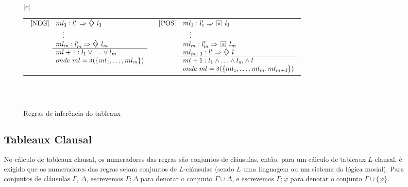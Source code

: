 \begin{figure*}[!tbh]
    \centering
    {\footnotesize
        \begin{tabular}{|c|}
            \hline
            \\
            \begin{tabular}{cc}
                $
                \begin{array}{cll}
                    \mbox{[NEG]} &ml_1: l_1 ' \then \pos{a}~ l_1 \\ 
                                  &\ ~\ \vdots \\
                                  &ml_m: l_m ' \then \pos{a}~ l_m\\ \cline{2-2}
                                  & ml+1: l_1 \vee \ldots \vee l_m \\
                                  & onde\ ml = \delta(\{ml_1,\ldots, ml_m\})
                \end{array}
                $
                &
                $
                \begin{array}{cll}
                    \mbox{[POS]} &ml_1: l_1 ' \then \nec{a}~ l_1 \\ 
                                  &\ ~\ \vdots \\
                                  &ml_m: l_m ' \then \nec{a}~ l_m\\ 
                                  &ml_{m+1}: l' \then \pos{a}~ l \\ \cline{2-2}
                                  & ml+1: l_1 \wedge \ldots \wedge l_m \wedge l \\
                                  & onde\ ml = \delta(\{ml_1,\ldots, ml_m,
                ml_{m+1}\})
                \end{array}
                $
            \end{tabular}
            \\
            \\
            \hline
    \end{tabular}}
            \caption{Regras de inferência do tableaux}
            \label{tableaux}
        \end{figure*}

\subsection{Tableaux Clausal}
No cálculo de tableaux clausal, os numeradores das regras são conjuntos de
cláusulas, então, para um cálculo de tableaux $L$-clausal, é exigido que os
numeradores das regras sejam conjuntos de $L$-cláusulas (sendo $L$ uma linguagem
ou um sistema da lógica modal). Para conjuntos de
cláusulas $\Gamma$, $\Delta$, escrevemos $\Gamma;\Delta$ para denotar o conjunto $\Gamma \cup \Delta$, e
escrevemos $\Gamma; \varphi$ para denotar o conjunto $\Gamma \cup \{\varphi\}$.

